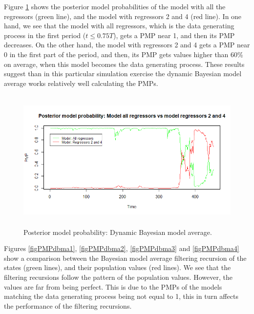Figure \ref{figPMPdbma} shows the posterior model probabilities of the model with all the regressors (green line), and the model with regressors 2 and 4 (red line). In one hand, we see that the model with all regressors, which is the data generating process in the first period ($t\leq 0.75T$), gets a PMP near 1, and then its PMP decreases. On the other hand, the model with regressors 2 and 4 gets a PMP near 0 in the first part of the period, and then, its PMP gets values higher than 60\% on average, when this model becomes the data generating process. These results suggest than in this particular simulation exercise the dynamic Bayesian model average works relatively well calculating the PMPs. 
  
\begin{figure}[!h]
	\includegraphics[width=340pt, height=200pt]{Chapters/chapter10/figures/figPMPdbma.png}
	\caption[List of figure caption goes here]{Posterior model probability: Dynamic Bayesian model average.}\label{figPMPdbma}
\end{figure}

Figures \ref{figPMPdbma1}, \ref{figPMPdbma2}, \ref{figPMPdbma3} and \ref{figPMPdbma4} show a comparison between the Bayesian model average filtering recursion of the states (green lines), and their population values (red lines). We see that the filtering recursions follow the pattern of the population values. However, the values are far from being perfect. This is due to the PMPs of the models matching the data generating process being not equal to 1, this in turn affects the performance of the filtering recursions.  

